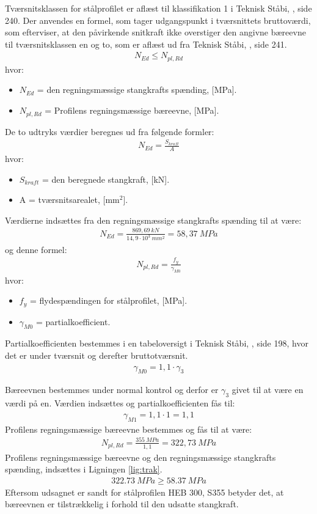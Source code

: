 Tværsnitsklassen for stålprofilet er aflæst til klassifikation 1 i Teknisk Ståbi, \citep{TekniskStobi}, side 240. Der anvendes en formel, som tager udgangspunkt i tværsnittets bruttoværdi, som efterviser, at den påvirkende snitkraft ikke overstiger den angivne bæreevne til tværsnitsklassen en og to, som er aflæst ud fra Teknisk Ståbi, \citep{TekniskStobi}, side 241. 
\begin{align}
 N_{Ed} \leq N_{pl,Rd}
 \label{lig:trak}
\end{align}
hvor: 
\begin{itemize}
\item $N_{Ed}$ = den regningsmæssige stangkrafts spænding, [MPa].
\item $N_{pl,Rd}$ = Profilens regningsmæssige bæreevne, [MPa].
\end{itemize}
De to udtryks værdier beregnes ud fra følgende formler:
\begin{align*}
N_{Ed} = \frac{S_{kraft}}{A}
\end{align*} 
hvor:
\begin{itemize}
\item $S_{kraft}$ = den beregnede stangkraft, [kN].
\item A = tværsnitsarealet, [mm$^2$].
\end{itemize}
Værdierne indsættes fra den regningsmæssige stangkrafts spænding til at være:
\begin{align*}
N_{Ed} = \frac{869,69 \SI{}{kN}}{14,9 \cdot 10^3 \SI{}{mm^2}} = 58,37 \SI{}{MPa}
\end{align*}
og denne formel:
\begin{align*}
N_{pl,Rd} = \frac{f_y}{\gamma_{M0}}
\end{align*}
hvor: 
\begin{itemize}
\item $f_y$ = flydespændingen for stålprofilet, [MPa].
\item $\gamma_{M0}$ = partialkoefficient.
\end{itemize} 
Partialkoefficienten bestemmes i en tabeloversigt i Teknisk Ståbi, \citep{TekniskStobi}, side 198, hvor det er under tværsnit og derefter bruttotværsnit. 
\begin{align*}
\gamma_{M0} = 1,1 \cdot \gamma_3
\end{align*}

Bæreevnen bestemmes under normal kontrol og derfor er $\gamma_3$  givet til at være en værdi på en. Værdien indsættes og partialkoefficienten fås til:
\begin{align*}
\gamma_{M1} = 1,1 \cdot 1 = 1,1
\end{align*}
Profilens regningsmæssige bæreevne bestemmes og fås til at være:
\begin{align*}
N_{pl,Rd} = \frac{355 \SI{}{MPa}}{1,1} = 322,73 \SI{}{MPa}
\end{align*}
Profilens regningsmæssige bæreevne og den regningsmæssige stangkrafts spænding, indsættes i Ligningen \ref{lig:trak}.
\begin{align*}
 \SI{322,73}{MPa} \geq  \SI{58,37}{MPa}
\end{align*}
Eftersom udsagnet er sandt for stålprofilen HEB 300, S355 betyder det, at bæreevnen er tilstrækkelig i forhold til den udsatte stangkraft.  

